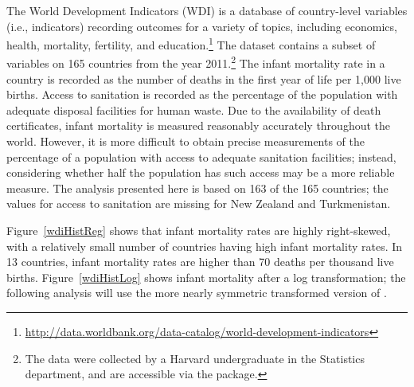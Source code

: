 The World Development Indicators (WDI) is a database of country-level variables (i.e., indicators) recording outcomes for a variety of topics, including economics, health, mortality, fertility, and education.\footnote{\url{http://data.worldbank.org/data-catalog/world-development-indicators}} The dataset  contains a subset of variables on 165 countries from the year 2011.\footnote{The data were collected by a Harvard undergraduate in the Statistics department, and are accessible via the  package.} The infant mortality rate in a country is recorded as the number of deaths in the first year of life per 1,000 live births. Access to sanitation is recorded as the percentage of the population with adequate disposal facilities for human waste. Due to the availability of death certificates, infant mortality is measured reasonably accurately throughout the world. However, it is more difficult to obtain precise measurements of the percentage of a population with access to adequate sanitation facilities; instead, considering whether half the population has such access may be a more reliable measure. The analysis presented here is based on 163 of the 165 countries; the values for access to sanitation are missing for New Zealand and Turkmenistan.

Figure~\ref{wdiHistReg} shows that infant mortality rates are highly right-skewed, with a relatively small number of countries having high infant mortality rates. In 13 countries, infant mortality rates are higher than 70 deaths per thousand live births. Figure~\ref{wdiHistLog} shows infant mortality after a log transformation; the following analysis will use the more nearly symmetric transformed version of .  

